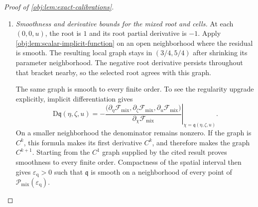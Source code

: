 \documentclass[11pt]{article}
\begin{document}
\begin{proof}[Proof of \cref{obj:lem:exact-calibrations}]
\begin{enumerate}
\item \emph{Smoothness and derivative bounds for the mixed root and cells.}
At each \((0,0,u)\), the root is \(1\) and its root partial derivative is \(-1\). Apply \cref{obj:lem:scalar-implicit-function} on an open neighborhood where the residual is smooth. The resulting local graph stays in \((3/4,5/4)\) after shrinking its parameter neighborhood. The negative root derivative persists throughout that bracket nearby, so the selected root agrees with this graph.

The same graph is smooth to every finite order. To see the regularity upgrade explicitly, implicit differentiation gives
\[
\mathrm D\mathfrak q(\eta,\zeta,u)
=
-\left.
\frac{
\bigl(\partial_\eta\mathcal F_{\mathrm{mix}},
      \partial_\zeta\mathcal F_{\mathrm{mix}},
      \partial_u\mathcal F_{\mathrm{mix}}\bigr)}
{\partial_\chi\mathcal F_{\mathrm{mix}}}
\right|_{\chi=\mathfrak q(\eta,\zeta,u)} .
\]
On a smaller neighborhood the denominator remains nonzero. If the graph is \(C^k\), this formula makes its first derivative \(C^k\), and therefore makes the graph \(C^{k+1}\). Starting from the \(C^1\) graph supplied by the cited result proves smoothness to every finite order. Compactness of the spatial interval then gives
\(\varepsilon_{\mathrm q}>0\) such that \(\mathfrak q\) is smooth on a neighborhood of every point of
\(\mathcal P_{\mathrm{mix}}(\varepsilon_{\mathrm q})\).


\end{enumerate}
\end{proof}
\end{document}
